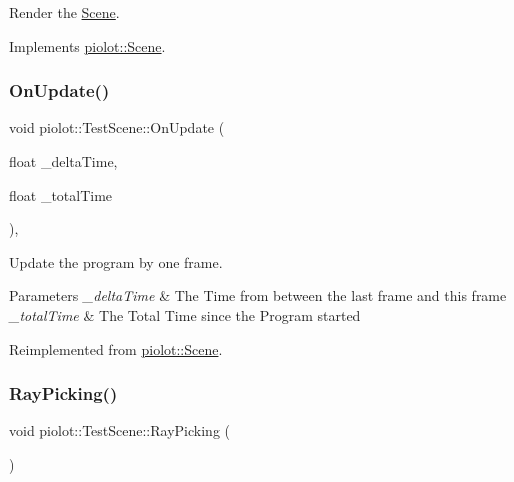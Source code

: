 Render the \mbox{\hyperlink{classpiolot_1_1_scene}{Scene}}. 



Implements \mbox{\hyperlink{group___virtual_gaaa3f6f2cb0dce355d890c8b43a2f11f2}{piolot\+::\+Scene}}.

\mbox{\label{classpiolot_1_1_test_scene_a1151c075257a2b626774502709e0aab9}} 
\subsubsection{\texorpdfstring{On\+Update()}{OnUpdate()}}
{\footnotesize\ttfamily void piolot\+::\+Test\+Scene\+::\+On\+Update (\begin{DoxyParamCaption}\item[{float}]{\+\_\+delta\+Time,  }\item[{float}]{\+\_\+total\+Time }\end{DoxyParamCaption})\hspace{0.3cm}{\ttfamily [override]}, {\ttfamily [virtual]}}



Update the program by one frame. 


\begin{DoxyParams}{Parameters}
{\em \+\_\+delta\+Time} & The Time from between the last frame and this frame \\
\hline
{\em \+\_\+total\+Time} & The Total Time since the Program started \\
\hline
\end{DoxyParams}


Reimplemented from \mbox{\hyperlink{group___virtual_gae05b812e9f1caa80526a79a03ab456e1}{piolot\+::\+Scene}}.

\mbox{\label{classpiolot_1_1_test_scene_a22c630a5e1c5725f04140ec15a125de7}} 
\subsubsection{\texorpdfstring{Ray\+Picking()}{RayPicking()}}
{\footnotesize\ttfamily void piolot\+::\+Test\+Scene\+::\+Ray\+Picking (\begin{DoxyParamCaption}{ }\end{DoxyParamCaption})}

